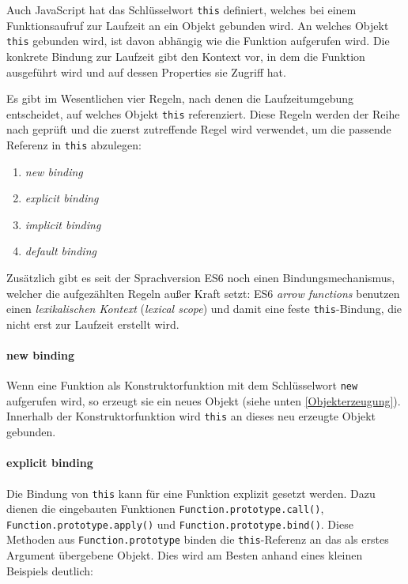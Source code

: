 Auch JavaScript hat das Schlüsselwort \texttt{this} definiert, welches bei einem Funktionsaufruf zur Laufzeit an ein Objekt gebunden wird. An welches Objekt \texttt{this} gebunden wird, ist davon abhängig wie die Funktion aufgerufen wird. Die konkrete Bindung zur Laufzeit gibt den Kontext vor, in dem die Funktion ausgeführt wird und auf dessen Properties sie Zugriff hat. 

Es gibt im Wesentlichen vier Regeln, nach denen die Laufzeitumgebung entscheidet, auf welches Objekt \texttt{this} referenziert. Diese Regeln werden der Reihe nach geprüft und die zuerst zutreffende Regel wird verwendet, um die passende Referenz in \texttt{this} abzulegen:
\begin{enumerate}
	\item \emph{new binding}
	\item \emph{explicit binding}
	\item \emph{implicit binding}
	\item \emph{default binding}
\end{enumerate}

Zusätzlich gibt es seit der Sprachversion ES6 noch einen Bindungsmechanismus, welcher die aufgezählten Regeln außer Kraft setzt:
ES6 \emph{arrow functions} benutzen einen \emph{lexikalischen Kontext} (\emph{lexical scope}) und damit eine feste \texttt{this}-Bindung, die nicht erst zur Laufzeit erstellt wird.

\paragraph{new binding} Wenn eine Funktion als Konstruktorfunktion mit dem Schlüsselwort \texttt{new} aufgerufen wird, so erzeugt sie ein neues Objekt (siehe unten \ref{Objekterzeugung}). Innerhalb der Konstruktorfunktion wird \texttt{this} an dieses neu erzeugte Objekt gebunden.

\paragraph{explicit binding} Die Bindung von \texttt{this} kann für eine Funktion explizit gesetzt werden. Dazu dienen die eingebauten Funktionen \texttt{Function.prototype.call()}, \texttt{Func\-tion.prototype.apply()} und \texttt{Func\-tion.prototype.bind()}. Diese Methoden aus \texttt{Func\-tion.prototype} binden die \texttt{this}-Referenz an das als erstes Argument übergebene Objekt. Dies wird am Besten anhand eines kleinen Beispiels deutlich:

